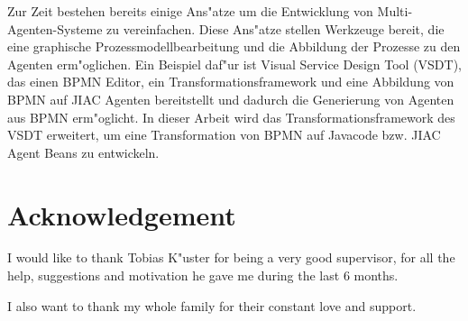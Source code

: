 Zur Zeit bestehen bereits einige Ans"atze um die Entwicklung von Multi-Agenten-Systeme zu vereinfachen. Diese Ans"atze stellen Werkzeuge bereit, die eine graphische Prozessmodellbearbeitung und die Abbildung der Prozesse zu den Agenten erm"oglichen. Ein Beispiel daf"ur ist Visual Service Design Tool (VSDT), das einen BPMN Editor, ein Transformationsframework und eine Abbildung von BPMN auf JIAC Agenten bereitstellt und dadurch die Generierung von Agenten aus BPMN erm"oglicht. In dieser Arbeit wird das Transformationsframework des VSDT erweitert, um eine Transformation von BPMN auf Javacode bzw. JIAC Agent Beans zu entwickeln. 

\newpage



\section*{Acknowledgement}
I would like to thank Tobias K"uster for being a very good supervisor, for all the help, suggestions and motivation he gave me during the last 6 months.

I also want to thank my whole family for their constant love and support. 



